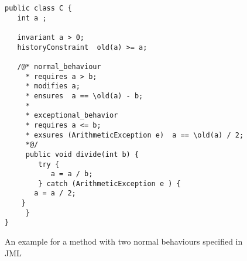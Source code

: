 \begin{figure}
\begin{lstlisting}[frame=trbl]
public class C {
   int a ;

   invariant a > 0; 
   historyConstraint  old(a) >= a;

   /@* normal_behaviour
     * requires a > b;
     * modifies a;
     * ensures  a == \old(a) - b;  
     *
     * exceptional_behavior
     * requires a <= b;
     * exsures (ArithmeticException e)  a == \old(a) / 2;
     *@/
     public void divide(int b) {
        try {
           a = a / b;
        } catch (ArithmeticException e ) { 
	   a = a / 2;
	}
     }
}
\end{lstlisting}
\caption{\sc An example for a method with two normal behaviours specified in JML} \label{bml:heavySp}
\end{figure}
